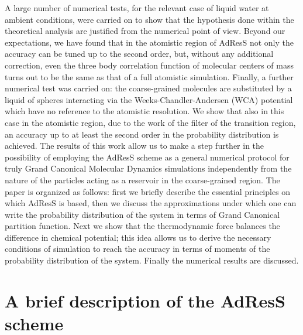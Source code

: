 \documentclass[aip,jcp,a4paper,reprint,onecolumn]{revtex4-1}
\begin{document}
A large number of numerical tests, for the relevant case of liquid water at ambient conditions, were carried on to show that the hypothesis done within the theoretical analysis are justified from the numerical point of view. Beyond our expectations, we have found that in the atomistic region of AdResS not only the accuracy can be tuned up to the second order, but, without any additional correction, even the three body correlation function of molecular centers of mass turns out to be the same as that of a full atomistic simulation. Finally, a further numerical test was carried on: the coarse-grained molecules are substituted by a liquid of spheres interacting via the Weeks-Chandler-Andersen (WCA)  potential \cite{wca} which have no reference to the atomistic resolution. We show that also in this case in the atomistic region, due to the work of the filter of the transition region, an accuracy up to at least the second order in the probability distribution is achieved.
The results of this work allow us to make a step further in the possibility of employing the AdResS scheme as a general numerical protocol for truly Grand Canonical Molecular Dynamics simulations
independently from the nature of the particles acting as a reservoir in the coarse-grained region. The paper is organized as follows: first we briefly describe the essential principles on which AdResS is based, then we discuss the approximations under which one can write the probability distribution of the system in terms of Grand Canonical partition function. Next we show that the thermodynamic force balances the difference in chemical potential; this idea allows us to derive the necessary conditions of simulation to reach the accuracy in terms of moments of the probability distribution of the system. 
Finally the numerical results are discussed.

\section{A brief description of the AdResS scheme}
\end{document}
